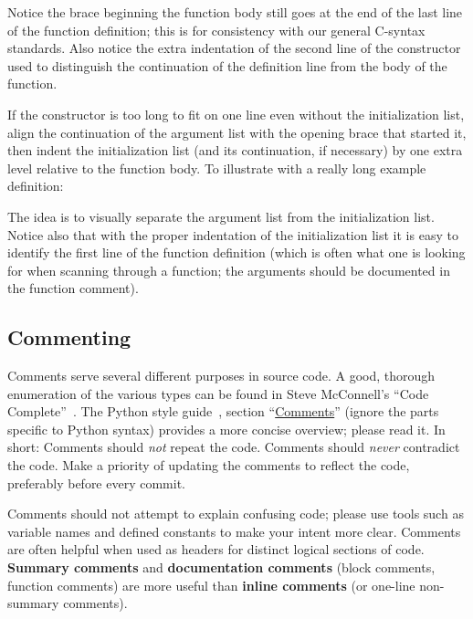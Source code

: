 \documentclass[12pt]{article}
\newcommand{\textdef}[1]{\textbf{#1}}
\begin{document}
Notice the brace beginning the function body still goes at the end of the last line of the function definition; this is for consistency with our general C-syntax standards. Also notice the extra indentation of the second line of the constructor used to distinguish the continuation of the definition line from the body of the function.

If the constructor is too long to fit on one line even without the initialization list, align the continuation of the argument list with the opening brace that started it, then indent the initialization list (and its continuation, if necessary) by one extra level relative to the function body. To illustrate with a really long example definition:
\begin{codeex}
VisionInterface:: VisionInterface(Matx33f cameraMat, Mat distCoeffs,
                                  Matx33f perspectiveTrans,
                                  std::string camAddress) :
        cameraMat(cameraMat), distCoeffs(distCoeffs),
        perspectiveTrans(perspectiveTrans) {
    openKrn = getStructuringElement(MORPH_ELLIPSE, Size(5, 5));
    ...
\end{codeex}

The idea is to visually separate the argument list from the initialization list. Notice also that with the proper indentation of the initialization list it is easy to identify the first line of the function definition (which is often what one is looking for when scanning through a function; the arguments should be documented in the function comment).
\subsection{Commenting}
Comments serve several different purposes in source code. A good, thorough enumeration of the various types can be found in Steve McConnell's ``Code Complete''~\cite{codecomplete}. The Python style guide~\cite{pyguide}, section ``\href{http://www.python.org/dev/peps/pep-0008/#comments}{Comments}'' (ignore the parts specific to Python syntax) provides a more concise overview; please read it. In short: Comments should \emph{not} repeat the code. Comments should \emph{never} contradict the code. Make a priority of updating the comments to reflect the code, preferably before every commit.

Comments should not attempt to explain confusing code; please use tools such as variable names and defined constants to make your intent more clear. Comments are often helpful when used as headers for distinct logical sections of code. \textdef{Summary comments} and \textdef{documentation comments} (block comments, function comments) are more useful than \textdef{inline comments} (or one-line non-summary comments).
\end{document}
